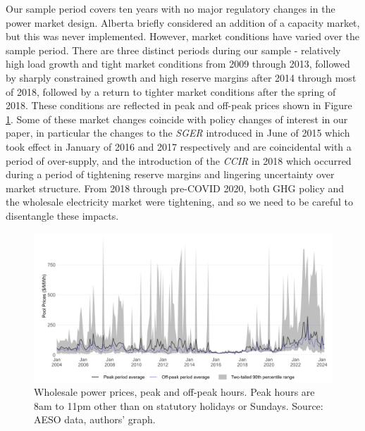 \documentclass[12pt]{article}
\begin{document}
Our sample period covers ten years with no major regulatory changes in the power market design. Alberta briefly considered an addition of a capacity market, but this was never implemented. However, market conditions have varied over the sample period. There are three distinct periods during our sample - relatively high load growth and tight market conditions from 2009 through 2013, followed by sharply constrained growth and high reserve margins after 2014 through most of 2018, followed by a return to tighter market conditions after the spring of 2018. These conditions are reflected in peak and off-peak prices shown in Figure \ref{fig:ab_prices}. Some of these market changes coincide with policy changes of interest in our paper, in particular the changes to the \emph{SGER} introduced in June of 2015 which took effect in January of 2016 and 2017 respectively and are coincidental with a period of over-supply, and the introduction of the \emph{CCIR} in 2018 which occurred during a period of tightening reserve margins and lingering uncertainty over market structure. From 2018 through pre-COVID 2020, both GHG policy and the wholesale electricity market were tightening, and so we need to be careful to disentangle these impacts.

\begin{figure}[t]%
	\centering \vspace{-.25cm} \includegraphics[width=6.5in]{../images/peak_prices.png}
\vspace{-0.75cm}	\caption{Wholesale power prices, peak and off-peak hours. Peak hours are 8am to 11pm other than on statutory holidays or Sundays. Source: AESO data, authors' graph.}
\label{fig:ab_prices}
\end{figure}
\end{document}
